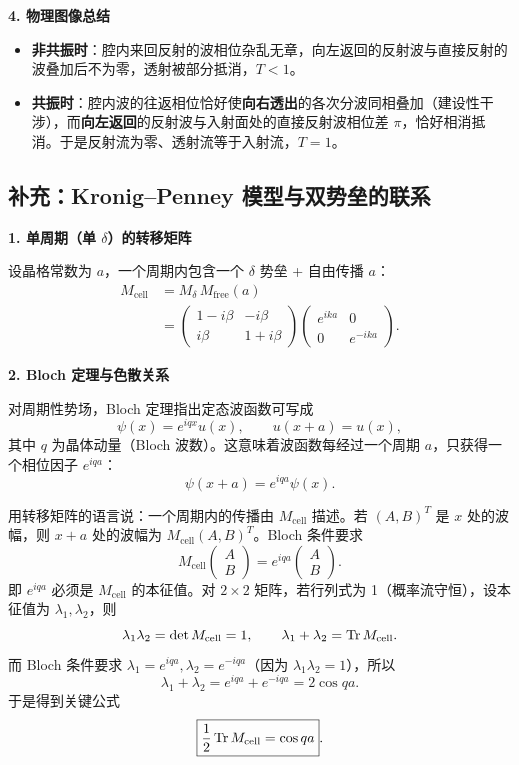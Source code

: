 \textbf{4. 物理图像总结}

\begin{itemize}[nosep]
    \item \textbf{非共振时}：腔内来回反射的波相位杂乱无章，向左返回的反射波与直接反射的波叠加后不为零，透射被部分抵消，$T<1$。
    \item \textbf{共振时}：腔内波的往返相位恰好使\textbf{向右透出}的各次分波同相叠加（建设性干涉），而\textbf{向左返回}的反射波与入射面处的直接反射波相位差 $\pi$，恰好相消抵消。于是反射流为零、透射流等于入射流，$T=1$。
\end{itemize}

\subsection{补充：Kronig--Penney 模型与双势垒的联系}

\textbf{1. 单周期（单 $\delta$）的转移矩阵}

设晶格常数为 $a$，一个周期内包含一个 $\delta$ 势垒 + 自由传播 $a$：
\begin{align*}
M_{\text{cell}} &= M_\delta \, M_{\text{free}}(a) \\
&= \begin{pmatrix} 1-i\beta & -i\beta \\ i\beta & 1+i\beta \end{pmatrix}
\begin{pmatrix} e^{ika} & 0 \\ 0 & e^{-ika} \end{pmatrix}.
\end{align*}

\textbf{2. Bloch 定理与色散关系}

对周期性势场，Bloch 定理指出定态波函数可写成
\[
\psi(x) = e^{iqx} u(x), \qquad u(x+a)=u(x),
\]
其中 $q$ 为晶体动量（Bloch 波数）。这意味着波函数每经过一个周期 $a$，只获得一个相位因子 $e^{iqa}$：
\[
\psi(x+a) = e^{iqa}\psi(x).
\]

用转移矩阵的语言说：一个周期内的传播由 $M_{\text{cell}}$ 描述。若 $(A,B)^T$ 是 $x$ 处的波幅，则 $x+a$ 处的波幅为 $M_{\text{cell}}(A,B)^T$。Bloch 条件要求
\[
M_{\text{cell}} \begin{pmatrix} A \\ B \end{pmatrix} = e^{iqa} \begin{pmatrix} A \\ B \end{pmatrix}.
\]
即 $e^{iqa}$ 必须是 $M_{\text{cell}}$ 的本征值。对 $2\times 2$ 矩阵，若行列式为 1（概率流守恒），设本征值为 $\lambda_1, \lambda_2$，则
\[
\lambda_1\lambda_2 = \det M_{\text{cell}} = 1, \qquad \lambda_1 + \lambda_2 = \Tr M_{\text{cell}}.
\]
而 Bloch 条件要求 $\lambda_1 = e^{iqa}, \lambda_2 = e^{-iqa}$（因为 $\lambda_1\lambda_2=1$），所以
\[
\lambda_1 + \lambda_2 = e^{iqa} + e^{-iqa} = 2\cos qa.
\]
于是得到关键公式
\[
\boxed{\frac{1}{2}\Tr M_{\text{cell}} = \cos qa}.
\]

